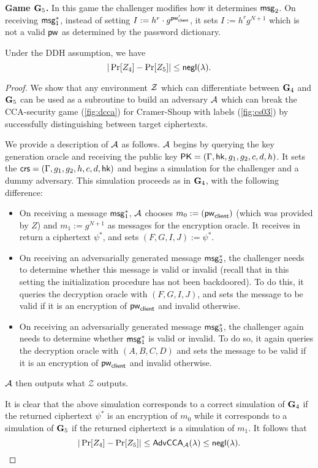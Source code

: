 
\textbf{Game $\mathbf{G}_5$.} In this game the challenger modifies how it determines $\mathsf{msg}_{2}$. On receiving $\mathsf{msg}_{1}^{*}$, instead of setting $I:=h^r\cdot g^{\mathsf{pw}_{\mathsf{client}}'}$, it sets $I:=h^rg^{N+1}$ which is not a valid $\mathsf{pw}$ as determined by the password dictionary. 

\begin{lemma}
	Under the DDH assumption, we have $$|\Pr[Z_4]-\Pr[Z_5]|\leq\mathsf{negl}(\lambda).$$
\end{lemma}
\begin{proof}
	We show that any environment $\mathcal{Z}$ which can differentiate between $\mathbf{G}_4$ and $\mathbf{G}_5$ can be used as a subroutine to build an adversary $\mathcal{A}$ which can break the CCA-security game (\cref{fig:dcca}) for Cramer-Shoup with labels (\cref{fig:cs03}) by successfully distinguishing between target ciphertexts. 
	
	We provide a description of $\mathcal{A}$ as follows. $\mathcal{A}$ begins by querying the key generation oracle and receiving the public key $\mathsf{PK} = (\Gamma,\mathsf{hk},g_1,g_2,c,d,h)$. It sets the $\mathsf{crs} = (\Gamma,g_1,g_2,h,c,d,\mathsf{hk})$ and begins a simulation for the challenger and a dummy adversary. This simulation proceeds as in $\mathbf{G}_4$, with the following difference:
	
	\begin{itemize}
		\item On receiving a message $\mathsf{msg}_{1}^{*}$, $\mathcal{A}$ chooses $m_0:=(\mathsf{pw}_{\mathsf{client}})$ (which was provided by $Z$) and $m_1:=g^{N+1}$ as messages for the encryption oracle. It receives in return a ciphertext $\psi^{*}$, and sets $(F,G,I,J):=\psi^{*}$.
		\item On receiving an adversarially generated message $\mathsf{msg}_{2}^{*}$, the challenger needs to determine whether this message is valid or invalid (recall that in this setting the initialization procedure has not been backdoored). To do this, it queries the decryption oracle with $(F,G,I,J)$, and sets the message to be valid if it is an encryption of $\mathsf{pw}_{\mathsf{client}}$ and invalid otherwise.
		\item On receiving an adversarially generated message $\mathsf{msg}_{3}^{*}$, the challenger again needs to determine whether $\mathsf{msg}_{1}^{*}$ is valid or invalid. To do so, it again queries the decryption oracle with $(A,B,C,D)$ and sets the message to be valid if it is an encryption of $\mathsf{pw}_{\mathsf{client}}$ and invalid otherwise.
	\end{itemize}

	$\mathcal{A}$ then outputs what $\mathcal{Z}$ outputs.

	It is clear that the above simulation corresponds to a correct simulation of $\mathbf{G}_4$ if the returned ciphertext $\psi^{*}$ is an encryption of $m_0$ while it corresponds to a simulation of $\mathbf{G}_5$ if the returned ciphertext is a simulation of $m_1$. It follows that $$|\Pr[Z_4]-\Pr[Z_5]|\leq\mathsf{AdvCCA}_{\mathcal{A}}(\lambda)\leq \mathsf{negl}(\lambda).$$ 
\end{proof}

